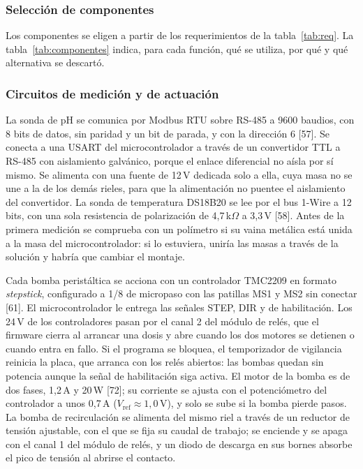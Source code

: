 \subsubsection{Selección de componentes}
Los componentes se eligen a partir de los requerimientos de la tabla~\ref{tab:req}. La tabla~\ref{tab:componentes} indica, para cada función, qué se utiliza, por qué y qué alternativa se descartó.


\subsubsection{Circuitos de medición y de actuación}\label{sec:circuitos}
La sonda de pH se comunica por Modbus RTU sobre RS-485 a 9600 baudios, con 8 bits de datos, sin paridad y un bit de parada, y con la dirección 6 [57]. Se conecta a una USART del microcontrolador a través de un convertidor TTL a RS-485 con aislamiento galvánico, porque el enlace diferencial no aísla por sí mismo. Se alimenta con una fuente de 12\,V dedicada solo a ella, cuya masa no se une a la de los demás rieles, para que la alimentación no puentee el aislamiento del convertidor. La sonda de temperatura DS18B20 se lee por el bus 1-Wire a 12 bits, con una sola resistencia de polarización de 4,7\,k$\Omega$ a 3,3\,V [58]. Antes de la primera medición se comprueba con un polímetro si su vaina metálica está unida a la masa del microcontrolador: si lo estuviera, uniría las masas a través de la solución y habría que cambiar el montaje.

Cada bomba peristáltica se acciona con un controlador TMC2209 en formato \emph{stepstick}, configurado a 1/8 de micropaso con las patillas MS1 y MS2 sin conectar [61]. El microcontrolador le entrega las señales STEP, DIR y de habilitación. Los 24\,V de los controladores pasan por el canal 2 del módulo de relés, que el firmware cierra al arrancar una dosis y abre cuando los dos motores se detienen o cuando entra en fallo. Si el programa se bloquea, el temporizador de vigilancia reinicia la placa, que arranca con los relés abiertos: las bombas quedan sin potencia aunque la señal de habilitación siga activa. El motor de la bomba es de dos fases, 1,2\,A y 20\,W [72]; su corriente se ajusta con el potenciómetro del controlador a unos 0,7\,A ($V_{\text{ref}}\approx1{,}0$\,V), y solo se sube si la bomba pierde pasos. La bomba de recirculación se alimenta del mismo riel a través de un reductor de tensión ajustable, con el que se fija su caudal de trabajo; se enciende y se apaga con el canal 1 del módulo de relés, y un diodo de descarga en sus bornes absorbe el pico de tensión al abrirse el contacto.

